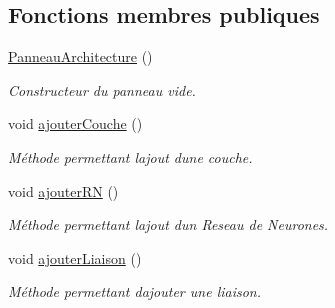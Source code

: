 \subsection*{Fonctions membres publiques}
\begin{DoxyCompactItemize}
\item 
\mbox{\label{class_panneau_architecture_a1143575686655c5088510a94eac5c787}} 
\hyperlink{class_panneau_architecture_a1143575686655c5088510a94eac5c787}{Panneau\+Architecture} ()
\begin{DoxyCompactList}\small\item\em Constructeur du panneau vide. \end{DoxyCompactList}\item 
\mbox{\label{class_panneau_architecture_affc6f75cb58e1c50aad26510bc2c25ea}} 
void \hyperlink{class_panneau_architecture_affc6f75cb58e1c50aad26510bc2c25ea}{ajouter\+Couche} ()
\begin{DoxyCompactList}\small\item\em Méthode permettant l\textquotesingle{}ajout d\textquotesingle{}une couche. \end{DoxyCompactList}\item 
\mbox{\label{class_panneau_architecture_a49eb9dea42db4fb1b16d91cfc1c789c3}} 
void \hyperlink{class_panneau_architecture_a49eb9dea42db4fb1b16d91cfc1c789c3}{ajouter\+RN} ()
\begin{DoxyCompactList}\small\item\em Méthode permettant l\textquotesingle{}ajout d\textquotesingle{}un Reseau de Neurones. \end{DoxyCompactList}\item 
\mbox{\label{class_panneau_architecture_ac623d04cebc723d2e590712a337cd5ab}} 
void \hyperlink{class_panneau_architecture_ac623d04cebc723d2e590712a337cd5ab}{ajouter\+Liaison} ()
\begin{DoxyCompactList}\small\item\em Méthode permettant d\textquotesingle{}ajouter une liaison. \end{DoxyCompactList}\item 
\mbox{\label{class_panneau_architecture_a4b90aec081c2b2d0b2a3c3207183bd3f}} 

\end{DoxyCompactItemize}
